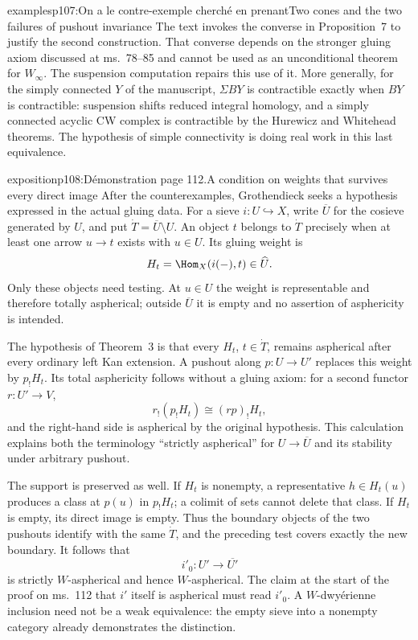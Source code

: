 \begin{dcomment}{examples}{p107:On a le contre-exemple cherché en prenant}{Two cones and the two failures of pushout invariance}
The text invokes the converse in Proposition~7 to justify the second construction. That converse depends on the stronger gluing axiom discussed at ms.~78--85 and cannot be used as an unconditional theorem for $W_\infty$. The suspension computation repairs this use of it. More generally, for the simply connected $Y$ of the manuscript, $\Sigma BY$ is contractible exactly when $BY$ is contractible: suspension shifts reduced integral homology, and a simply connected acyclic CW complex is contractible by the Hurewicz and Whitehead theorems. The hypothesis of simple connectivity is doing real work in this last equivalence.
\end{dcomment}

\begin{dcomment}{exposition}{p108:Démonstration page 112.}{A condition on weights that survives every direct image}
After the counterexamples, Grothendieck seeks a hypothesis expressed in the actual gluing data. For a sieve $i:U\hookrightarrow X$, write $\overline U$ for the cosieve generated by $U$, and put $\dot T=\overline U\setminus U$. An object $t$ belongs to $\dot T$ precisely when at least one arrow $u\to t$ exists with $u\in U$. Its gluing weight is
\[
 H_t=\Hom_X(i(-),t)\in\widehat U.
\]
Only these objects need testing. At $u\in U$ the weight is representable and therefore totally aspherical; outside $\overline U$ it is empty and no assertion of asphericity is intended.

The hypothesis of Theorem~3 is that every $H_t$, $t\in\dot T$, remains aspherical after every ordinary left Kan extension. A pushout along $p:U\to U'$ replaces this weight by $p_!H_t$. Its total asphericity follows without a gluing axiom: for a second functor $r:U'\to V$,
\[
 r_!(p_!H_t)\cong(rp)_!H_t,
\]
and the right-hand side is aspherical by the original hypothesis. This calculation explains both the terminology ``strictly aspherical'' for $U\to\overline U$ and its stability under arbitrary pushout.

The support is preserved as well. If $H_t$ is nonempty, a representative $h\in H_t(u)$ produces a class at $p(u)$ in $p_!H_t$; a colimit of sets cannot delete that class. If $H_t$ is empty, its direct image is empty. Thus the boundary objects of the two pushouts identify with the same $\dot T$, and the preceding test covers exactly the new boundary. It follows that
\[
 i'_0:U'\longrightarrow\overline{U'}
\]
is strictly $W$-aspherical and hence $W$-aspherical. The claim at the start of the proof on ms.~112 that $i'$ itself is aspherical must read $i'_0$. A $W$-dwyérienne inclusion need not be a weak equivalence: the empty sieve into a nonempty category already demonstrates the distinction.


\end{dcomment}
